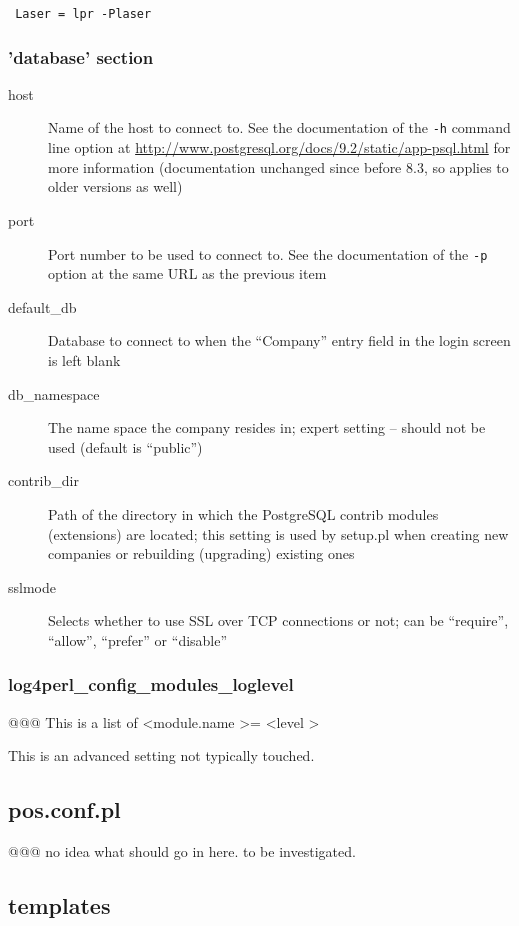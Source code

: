 \texttt{
Laser    = lpr -Plaser
}


\subsubsection{'database' section}

\begin{description}
\item [host] Name of the host to connect to. See the documentation of the {\tt -h} command line option at 
   \url{http://www.postgresql.org/docs/9.2/static/app-psql.html}
   for more information (documentation unchanged since before 8.3, so applies to older versions as well)
\item [port] Port number to be used to connect to. See the documentation of the {\tt -p} option at the
   same URL as the previous item
\item [default\_db] Database to connect to when the ``Company'' entry field in the login screen is left blank
\item [db\_namespace] The name space the company resides in; expert setting -- should not be used (default is
   ``public'')
\item [contrib\_dir] Path of the directory in which the PostgreSQL contrib modules (extensions) are
   located; this setting is used by setup.pl when creating new companies or rebuilding (upgrading)
   existing ones
\item [sslmode] Selects whether to use \gls{SSL} over TCP connections or not; can be ``require'', ``allow'',
   ``prefer'' or ``disable''
\end{description}

\subsubsection{log4perl\_config\_modules\_loglevel}

@@@ This is a list of \textless module.name \textgreater = \textless level \textgreater

This is an advanced setting not typically touched.


\subsection{pos.conf.pl}

@@@ no idea what should go in here. to be investigated.

\subsection{templates}
\label{subsec:GlobalConfigTemplates}

